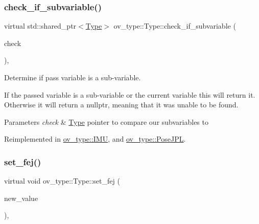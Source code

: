 \subsubsection{\texorpdfstring{check\+\_\+if\+\_\+subvariable()}{check\_if\_subvariable()}}
{\footnotesize\ttfamily virtual std\+::shared\+\_\+ptr$<$\hyperlink{classov__type_1_1Type}{Type}$>$ ov\+\_\+type\+::\+Type\+::check\+\_\+if\+\_\+subvariable (\begin{DoxyParamCaption}\item[{const std\+::shared\+\_\+ptr$<$ \hyperlink{classov__type_1_1Type}{Type} $>$}]{check }\end{DoxyParamCaption})\hspace{0.3cm}{\ttfamily [inline]}, {\ttfamily [virtual]}}



Determine if pass variable is a sub-\/variable. 

If the passed variable is a sub-\/variable or the current variable this will return it. Otherwise it will return a nullptr, meaning that it was unable to be found.


\begin{DoxyParams}{Parameters}
{\em check} & \hyperlink{classov__type_1_1Type}{Type} pointer to compare our subvariables to \\
\hline
\end{DoxyParams}


Reimplemented in \hyperlink{classov__type_1_1IMU_a3fb9631390473158abcdf97c71ea6e16}{ov\+\_\+type\+::\+I\+MU}, and \hyperlink{classov__type_1_1PoseJPL_aa2138dce0eef761ebbeacc0136da34cc}{ov\+\_\+type\+::\+Pose\+J\+PL}.

\mbox{\label{classov__type_1_1Type_ab8345946b27cb43e0cfc36454a06686d}} 
\subsubsection{\texorpdfstring{set\+\_\+fej()}{set\_fej()}}
{\footnotesize\ttfamily virtual void ov\+\_\+type\+::\+Type\+::set\+\_\+fej (\begin{DoxyParamCaption}\item[{const Eigen\+::\+Matrix\+Xd \&}]{new\+\_\+value }\end{DoxyParamCaption})\hspace{0.3cm}{\ttfamily [inline]}, {\ttfamily [virtual]}}



